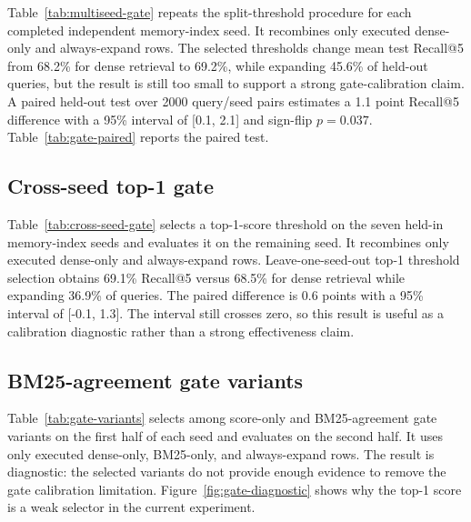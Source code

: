 \documentclass[10pt]{article}
\begin{document}
Table~\ref{tab:multiseed-gate} repeats the split-threshold procedure for each completed
independent memory-index seed. It recombines only executed dense-only and
always-expand rows. The selected thresholds change mean test Recall@5 from 68.2\% for dense retrieval to 69.2\%, while expanding 45.6\% of held-out queries, but the result is still too
small to support a strong gate-calibration claim. A paired held-out test over 2000 query/seed pairs estimates a 1.1 point Recall@5 difference with a 95\% interval of [0.1, 2.1] and sign-flip $p=0.037$.
Table~\ref{tab:gate-paired} reports the paired test.

\begin{table}[!tbp]
\caption{Paired uncertainty for held-out gate validation.}
\label{tab:gate-paired}
\centering
\scriptsize

\end{table}

\subsection{Cross-seed top-1 gate}
\begin{table}[!tbp]
\caption{Leave-one-seed-out top-1 gate validation.}
\label{tab:cross-seed-gate}
\centering
\scriptsize

\end{table}

Table~\ref{tab:cross-seed-gate} selects a top-1-score threshold on the seven
held-in memory-index seeds and evaluates it on the remaining seed. It recombines only executed
dense-only and always-expand rows. Leave-one-seed-out top-1 threshold selection obtains 69.1\% Recall@5 versus 68.5\% for dense retrieval while expanding 36.9\% of queries. The paired difference is 0.6 points with a 95\% interval of [-0.1, 1.3]. The interval
still crosses zero, so this result is useful as a calibration diagnostic rather
than a strong effectiveness claim.

\subsection{BM25-agreement gate variants}
\begin{table}[!tbp]
\caption{Held-out BM25-agreement gate variants.}
\label{tab:gate-variants}
\centering
\scriptsize

\end{table}

Table~\ref{tab:gate-variants} selects among score-only and BM25-agreement gate variants on
the first half of each seed and evaluates on the second half. It uses only
executed dense-only, BM25-only, and always-expand rows. The result is diagnostic:
the selected variants do not provide enough evidence to remove the gate
calibration limitation. Figure~\ref{fig:gate-diagnostic} shows why the
top-1 score is a weak selector in the current experiment.
\end{document}
